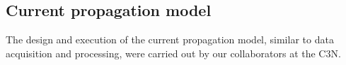 \documentclass[../main.tex]{subfiles}
\begin{document}

\subsection{Current propagation model}
The design and execution of the current propagation model, similar to data acquisition and processing, were carried out by our collaborators at the C3N.
\end{document}
